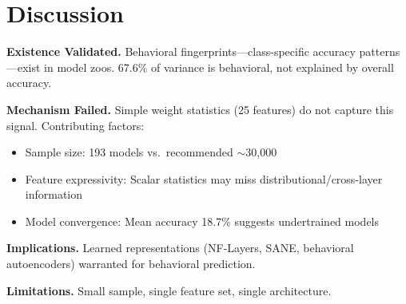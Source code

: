\section{Discussion}

\textbf{Existence Validated.} Behavioral fingerprints---class-specific accuracy patterns---exist in model zoos. 67.6\% of variance is behavioral, not explained by overall accuracy.

\textbf{Mechanism Failed.} Simple weight statistics (25 features) do not capture this signal. Contributing factors:
\begin{itemize}
    \item Sample size: 193 models vs.\ recommended $\sim$30,000
    \item Feature expressivity: Scalar statistics may miss distributional/cross-layer information
    \item Model convergence: Mean accuracy 18.7\% suggests undertrained models
\end{itemize}

\textbf{Implications.} Learned representations (NF-Layers, SANE, behavioral autoencoders) warranted for behavioral prediction.

\textbf{Limitations.} Small sample, single feature set, single architecture.

